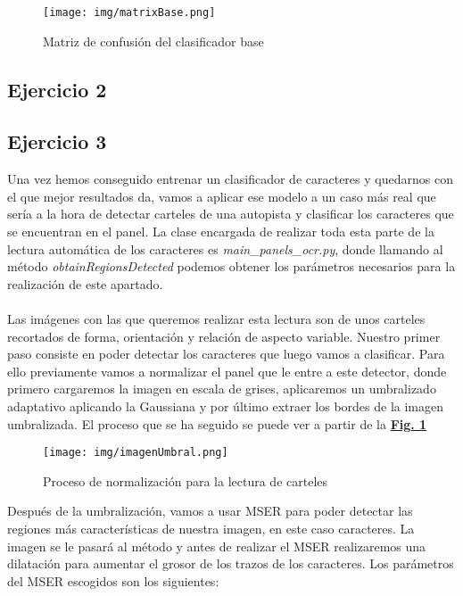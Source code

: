 \documentclass[a4paper, 12pt]{article}
\begin{document}
\begin{figure}[h]
	\centering
	\texttt{[image: img/matrixBase.png]}
 	\caption{Matriz de confusión del clasificador base}\vspace{0.5cm}
	\label{fig:normalizacion}
\end{figure}


\subsection{Ejercicio 2}

\subsection{Ejercicio 3}
Una vez hemos conseguido entrenar un clasificador de caracteres y quedarnos con el que mejor resultados da, vamos a aplicar ese modelo a un caso más real que sería a la hora de detectar carteles de una autopista y clasificar los caracteres que se encuentran en el panel. La clase encargada de realizar toda esta parte de la lectura automática de los caracteres es \textit{main\_panels\_ocr.py}, donde llamando al método \textit{obtainRegionsDetected} podemos obtener los parámetros necesarios para la realización de este apartado. \\\\
Las imágenes con las que queremos realizar esta lectura son de unos carteles recortados de forma, orientación y relación de aspecto variable. Nuestro primer paso consiste en poder detectar los caracteres que luego vamos a clasificar. Para ello previamente vamos a normalizar el panel que le entre a este detector, donde primero cargaremos la imagen en escala de grises, aplicaremos un umbralizado adaptativo aplicando la Gaussiana y por último extraer los bordes de la imagen umbralizada. El proceso que se ha seguido se puede ver a partir de la \textbf{\hyperref[fig:normalizacion]{Fig. 1}}
\newpage
\begin{figure}[h]
	\centering
	\texttt{[image: img/imagenUmbral.png]}
 	\caption{Proceso de normalización para la lectura de carteles}\vspace{0.5cm}
	\label{fig:normalizacion}
\end{figure}
Después de la umbralización, vamos a usar MSER para poder detectar las regiones más características de nuestra imagen, en este caso caracteres. La imagen se le pasará al método y antes de realizar el MSER realizaremos una dilatación para aumentar el grosor de los trazos de los caracteres. Los parámetros del MSER escogidos son los siguientes:
\end{document}
